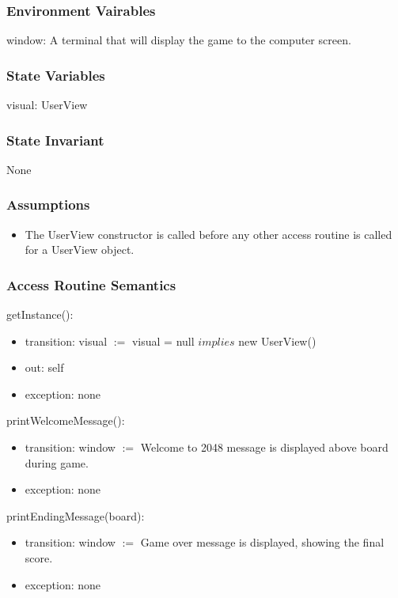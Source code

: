 \documentclass[12pt]{article}
\begin{document}
\subsubsection* {Environment Vairables}

window: A terminal that will display the game to the computer screen.

\subsubsection* {State Variables}

visual: UserView

\subsubsection* {State Invariant}

None

\subsubsection* {Assumptions}

\begin{itemize}
    \item The UserView constructor is called before any other access routine is called for a UserView object.
\end{itemize}

\subsubsection* {Access Routine Semantics}
getInstance(): 
\begin{itemize}
    \item transition: visual $:=$ visual = null $implies$ new UserView()
    \item out: self
    \item exception: none
\end{itemize}

\noindent printWelcomeMessage(): 
\begin{itemize}
    \item transition: window $:=$ Welcome to 2048 message is displayed above board during game.
    \item exception: none
\end{itemize}

\noindent printEndingMessage(board): 
\begin{itemize}
    \item transition: window $:=$ Game over message is displayed, showing the final score.
    \item exception: none
\end{itemize}
\end{document}
